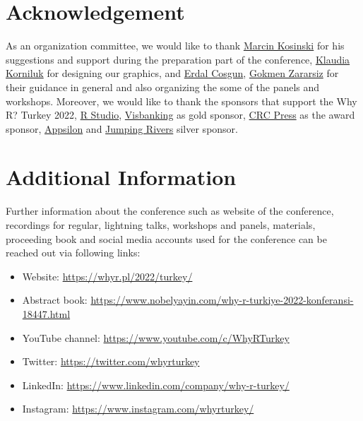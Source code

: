 \section*{Acknowledgement}

As an organization committee, we would like to thank \href{https://www.linkedin.com/in/mkosinski/}{Marcin Kosinski} for his suggestions and support during the preparation part of the conference, \href{https://www.linkedin.com/in/klaudia-korniluk/}{Klaudia Korniluk} for designing our graphics, and  \href{https://www.microsoft.com/en-us/research/people/ercosgun/}{Erdal Cosgun}, \href{https://avesis.erciyes.edu.tr/gokmenzararsiz}{Gokmen Zararsiz} for their guidance in general and also organizing the some of the panels and workshops. Moreover,
we would like to thank the sponsors that support the Why R? Turkey 2022, \href{https://www.rstudio.com/}{R Studio}, \href{https://visbanking.com/}{Visbanking} as gold sponsor, \href{https://www.routledge.com/go/crc-press}{CRC Press} as the award sponsor, \href{https://appsilon.com/}{Appsilon} and \href{https://www.jumpingrivers.com/}{Jumping Rivers} silver sponsor. 

\section*{Additional Information}

Further information about the conference such as website of the conference, recordings for regular, lightning talks, workshops and panels, materials, proceeding book and social media accounts used for the conference can be reached out via following links:

\begin{itemize}
    \item Website: \url{https://whyr.pl/2022/turkey/}
    \item Abstract book: \url{https://www.nobelyayin.com/why-r-turkiye-2022-konferansi-18447.html}
    \item YouTube channel: \url{https://www.youtube.com/c/WhyRTurkey}
    \item Twitter: \url{https://twitter.com/whyrturkey}
    \item LinkedIn: \url{https://www.linkedin.com/company/why-r-turkey/}
    \item Instagram: \url{https://www.instagram.com/whyrturkey/} 
\end{itemize}


